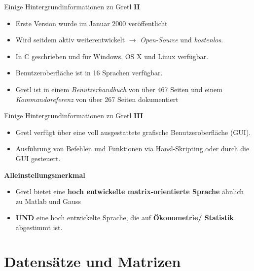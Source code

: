 \documentclass{beamer}[11pt]
\begin{document}
\begin{frame}{Einige Hintergrundinformationen zu Gretl \textbf{II}}
	\begin{itemize}
		\item Erste Version wurde im Januar 2000 veröffentlicht
		\item Wird seitdem aktiv weiterentwickelt $\to$ \textit{Open-Source} und \textit{kostenlos}.
		\item In C geschrieben und für Windows, OS X und Linux verfügbar.
		\item Benutzeroberfläche ist in 16 Sprachen verfügbar.
		\item Gretl ist in einem \textit{Benutzerhandbuch} von über 467 Seiten und einem \textit{Kommandoreferenz} von über 267 Seiten dokumentiert
	\end{itemize}
\end{frame}


\begin{frame}{Einige Hintergrundinformationen zu Gretl \textbf{III}}
	\begin{itemize}
		\item Gretl verfügt über eine voll ausgestattete grafische Benutzeroberfläche (GUI).
		\item Ausführung von Befehlen und Funktionen via Hansl-Skripting oder durch die GUI gesteuert.
	\end{itemize}

	\vspace{0.5cm}
	\textbf{Alleinstellungsmerkmal}

	\begin{itemize}
		\item Gretl bietet eine \textbf{hoch entwickelte matrix-orientierte Sprache} ähnlich zu Matlab und Gauss
		\item \textbf{UND} eine hoch entwickelte Sprache, die auf \textbf{Ökonometrie/ Statistik} abgestimmt ist.
	\end{itemize}
\end{frame}


\section{Datensätze und Matrizen}
\end{document}
